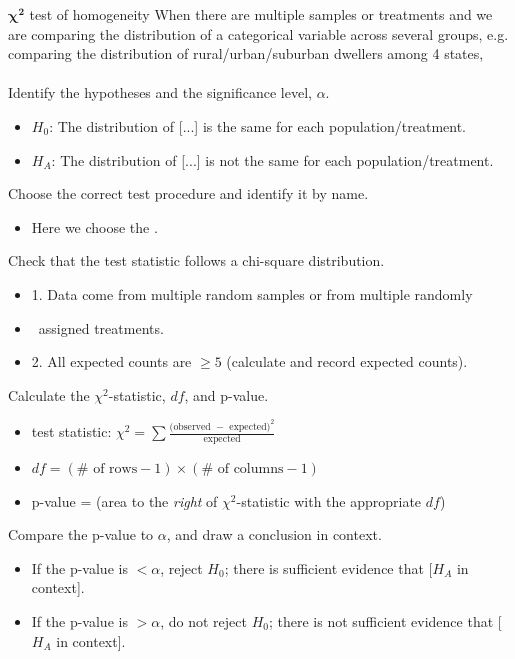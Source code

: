 \begin{onebox}{$\mathbf{\chi^2}$ test of homogeneity}
 When there are multiple samples or treatments and we are comparing the distribution
of a categorical variable across several groups, e.g. comparing the distribution of
rural/urban/suburban dwellers among 4 states, 
\\
\\
 Identify the hypotheses and the significance level, $\alpha$. \vspace{-1mm}
\begin{itemize}
\setlength{\itemsep}{0mm}
\item[] $H_0$: The distribution of [...] is the same for each population/treatment.  
\item[] $H_A$: The distribution of [...] is not the same for each population/treatment.   
\end{itemize}
 Choose the correct test procedure and identify it by name.\vspace{-1mm}
\begin{itemize}
\item[]  Here we choose the .
\end{itemize}
  Check that the test statistic follows a chi-square distribution.\vspace{-1mm}
\begin{itemize}
\setlength{\itemsep}{0mm}
\item[] 1.  Data come from multiple random samples or from multiple randomly 
\item[] \quad \ assigned treatments.
\item[] 2.  All expected counts are $\ge 5$ (calculate and record expected counts).
\end{itemize}
 Calculate the $\chi^2$-statistic, $df$, and p-value.\vspace{-1mm}  
\begin{itemize}
\setlength{\itemsep}{0mm}
\item[] test statistic:  $\chi^2 =\sum{ \frac{\text{(observed } - \text{ expected})^2}{\text{expected}}}$ 
\item[] $df = (\# \text{ of rows} - 1) \times (\# \text{ of columns} - 1)$
\item[] p-value = (area to the \emph{right} of $\chi^2$-statistic with the appropriate $df$)
\end{itemize}
 Compare the p-value to $\alpha$, and draw a conclusion in context.
\begin{itemize}\vspace{-1mm}
\setlength{\itemsep}{0mm}
\item[] If the p-value is $< \alpha$, reject $H_0$; there is sufficient evidence that [$H_A$ in context]. 
\item[] If the p-value is $> \alpha$, do not reject $H_0$; there is not sufficient evidence that [$H_A$ in context].
\end{itemize}\end{onebox}



